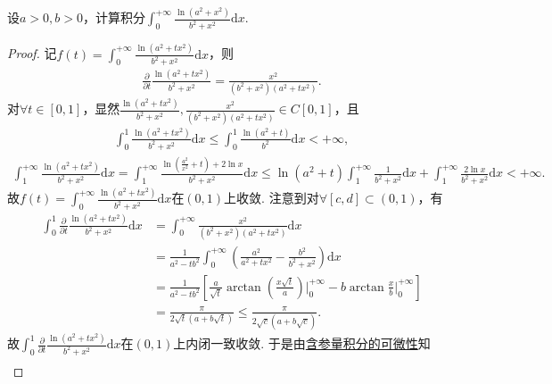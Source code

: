 \documentclass[../../main.tex]{subfiles}%
\begin{document}
\begin{example}
设$a>0,b>0$，计算积分$\int_0^{+\infty}\frac{\ln(a^2+x^2)}{b^2+x^2}\mathrm{d}x.$
\end{example}
\begin{proof}
记$f(t)=\int_0^{+\infty}\frac{\ln \left( a^2+tx^2 \right)}{b^2+x^2}\mathrm{d}x$，则
\begin{align*}
\frac{\partial}{\partial t}\frac{\ln \left( a^2+tx^2 \right)}{b^2+x^2}=\frac{x^2}{\left( b^2+x^2 \right) \left( a^2+tx^2 \right)}.
\end{align*}
对$\forall t\in \left[ 0,1 \right]$，显然$\frac{\ln \left( a^2+tx^2 \right)}{b^2+x^2},\frac{x^2}{\left( b^2+x^2 \right) \left( a^2+tx^2 \right)}\in C\left[ 0,1 \right]$，且
\begin{align*}
\int_0^1\frac{\ln \left( a^2+tx^2 \right)}{b^2+x^2}\mathrm{d}x\leqslant \int_0^1\frac{\ln \left( a^2+t \right)}{b^2}\mathrm{d}x<+\infty,
\end{align*}
\begin{align*}
\int_1^{+\infty}\frac{\ln \left( a^2+tx^2 \right)}{b^2+x^2}\mathrm{d}x=\int_1^{+\infty}\frac{\ln \left( \frac{a^2}{x^2}+t \right) +2\ln x}{b^2+x^2}\mathrm{d}x
\leqslant \ln \left( a^2+t \right) \int_1^{+\infty}\frac{1}{b^2+x^2}\mathrm{d}x+\int_1^{+\infty}\frac{2\ln x}{b^2+x^2}\mathrm{d}x<+\infty.
\end{align*}
故$f(t)=\int_0^{+\infty}\frac{\ln \left( a^2+tx^2 \right)}{b^2+x^2}\mathrm{d}x$在$\left( 0,1 \right)$上收敛. 注意到对$\forall \left[ c,d \right] \subset \left( 0,1 \right)$，有
\begin{align*}
\int_0^1\frac{\partial}{\partial t}\frac{\ln \left( a^2+tx^2 \right)}{b^2+x^2}\mathrm{d}x&=\int_0^{+\infty}\frac{x^2}{\left( b^2+x^2 \right) \left( a^2+tx^2 \right)}\mathrm{d}x\\
&=\frac{1}{a^2-tb^2}\int_0^{+\infty}\left( \frac{a^2}{a^2+tx^2}-\frac{b^2}{b^2+x^2} \right) \mathrm{d}x\\
&=\frac{1}{a^2-tb^2}\left[ \frac{a}{\sqrt{t}}\arctan \left( \frac{x\sqrt{t}}{a} \right) \bigg|_{0}^{+\infty}-b\arctan \frac{x}{b}\bigg|_{0}^{+\infty} \right] \\
&=\frac{\pi}{2\sqrt{t}\left( a+b\sqrt{t} \right)}\leqslant \frac{\pi}{2\sqrt{c}\left( a+b\sqrt{c} \right)}.
\end{align*}
故$\int_0^1\frac{\partial}{\partial t}\frac{\ln \left( a^2+tx^2 \right)}{b^2+x^2}\mathrm{d}x$在$\left( 0,1 \right)$上内闭一致收敛. 于是由\hyperref[theorem:含参反常积分的可微性]{含参量积分的可微性}知
\begin{align*}

\end{align*}
\end{proof}
\end{document}
